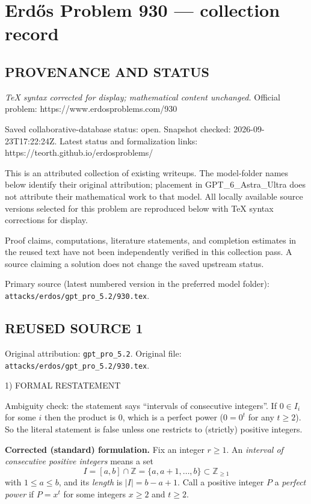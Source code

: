 \section*{Erd\H{o}s Problem 930 --- collection record}

\subsection*{PROVENANCE AND STATUS}

\emph{TeX syntax corrected for display; mathematical content unchanged.}
Official problem: https://www.erdosproblems.com/930

Saved collaborative-database status: open.
Snapshot checked: 2026-09-23T17:22:24Z.
Latest status and formalization links: https://teorth.github.io/erdosproblems/

This is an attributed collection of existing writeups. The model-folder names below identify their original attribution; placement in GPT\_6\_Astra\_Ultra does not attribute their mathematical work to that model. All locally available source versions selected for this problem are reproduced below with TeX syntax corrections for display.

Proof claims, computations, literature statements, and completion estimates in the reused text have not been independently verified in this collection pass. A source claiming a solution does not change the saved upstream status.

Primary source (latest numbered version in the preferred model folder): \texttt{attacks/erdos/gpt\_pro\_5.2/930.tex}.

\subsection*{REUSED SOURCE 1}
Original attribution: \texttt{gpt\_pro\_5.2}.
Original file: \texttt{attacks/erdos/gpt\_pro\_5.2/930.tex}.


1) FORMAL RESTATEMENT

Ambiguity check: the statement says ``intervals of consecutive integers''. If $0\in I_i$ for some $i$ then the product is $0$, which is a perfect power ($0=0^t$ for any $t\ge 2$). So the literal statement is false unless one restricts to (strictly) positive integers.

\medskip
\noindent\textbf{Corrected (standard) formulation.}
Fix an integer $r\ge 1$. An \emph{interval of consecutive positive integers} means a set
\[
I=[a,b]\cap\mathbb Z=\{a,a+1,\dots,b\}\subset\mathbb Z_{\ge 1}
\]
with $1\le a\le b$, and its \emph{length} is $|I|=b-a+1$.
Call a positive integer $P$ a \emph{perfect power} if $P=x^t$ for some integers $x\ge 2$ and $t\ge 2$.

